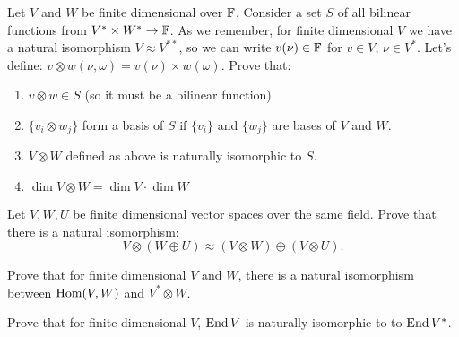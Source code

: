 \begin{prob}
  Let $V$ and $W$ be finite dimensional over $\mathbb F$.
  Consider a set $S$ of all bilinear functions from $V^*\times W^*\to \mathbb F$. As we remember, for finite dimensional $V$ we have a natural isomorphism $V\approx V^{**}$,
  so we can write $v(\nu)\in \mathbb F$ for $v\in V,\,\nu\in V^*$. Let's define: $v\otimes w(\nu, \omega) = v(\nu)\times w(\omega)$. Prove that:
  \begin{enumerate}
    \item $v\otimes w\in S$ (so it must be a bilinear function)
    \item $\{v_i\otimes w_j\}$ form a basis of $S$ if $\{v_i\}$ and $\{w_j\}$ are bases of $V$ and $W$.
    \item $V\otimes W$ defined as above is naturally isomorphic to $S$.
    \item $\dim V\otimes W = \dim V \cdot \dim W$
  \end{enumerate}
\end{prob}

\begin{prob}
  Let $V, W, U$ be finite dimensional vector spaces over the same field. Prove that there is a natural isomorphism:
  $$V\otimes(W\oplus U)\approx (V\otimes W) \oplus (V\otimes U).$$
\end{prob}

\begin{prob}
  Prove that for finite dimensional $V$ and $W$, there is a natural isomorphism between $\text{Hom}(V,W)$ and $V^*\otimes W$.
\end{prob}

\begin{prob}
  Prove that for finite dimensional $V$, $\text{End\,} V$ is naturally isomorphic to to $\text{End\,} V^*$.
\end{prob}

%
%
%
